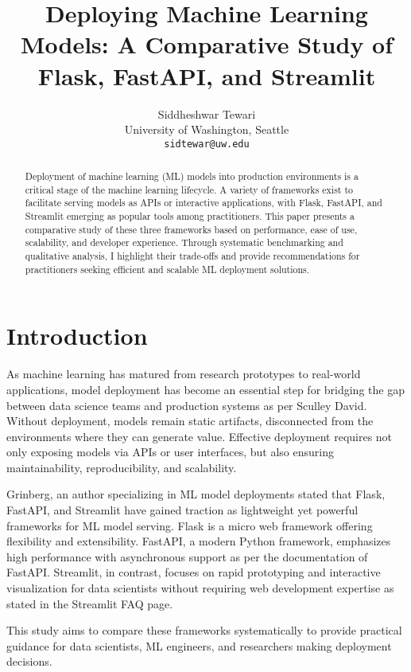 \documentclass[12pt]{article}
\title{Deploying Machine Learning Models: A Comparative Study of Flask, FastAPI, and Streamlit}
\author{Siddheshwar Tewari \\
University of Washington, Seattle \\
\texttt{sidtewar@uw.edu}}
\date{}
\begin{document}
\maketitle

\begin{abstract}
Deployment of machine learning (ML) models into production environments is a critical stage of the machine learning lifecycle. A variety of frameworks exist to facilitate serving models as APIs or interactive applications, with Flask, FastAPI, and Streamlit emerging as popular tools among practitioners. This paper presents a comparative study of these three frameworks based on performance, ease of use, scalability, and developer experience. Through systematic benchmarking and qualitative analysis, I highlight their trade-offs and provide recommendations for practitioners seeking efficient and scalable ML deployment solutions.
\end{abstract}


\section{Introduction}

As machine learning has matured from research prototypes to real-world applications, model deployment has become an essential step for bridging the gap between data science teams and production systems as per \cite{Sculley2015Hidden}Sculley David. Without deployment, models remain static artifacts, disconnected from the environments where they can generate value. Effective deployment requires not only exposing models via APIs or user interfaces, but also ensuring maintainability, reproducibility, and scalability.

\cite{Grinberg2018Flask}Grinberg, an author specializing in ML model deployments stated that Flask, FastAPI, and Streamlit have gained traction as lightweight yet powerful frameworks for ML model serving. Flask is a micro web framework offering flexibility and extensibility. FastAPI, a modern Python framework, emphasizes high performance with asynchronous support as per the documentation of \cite{FastAPI2023}FastAPI. Streamlit, in contrast, focuses on rapid prototyping and interactive visualization for data scientists without requiring web development expertise as stated in the \cite{Streamlit2022}Streamlit FAQ page.

This study aims to compare these frameworks systematically to provide practical guidance for data scientists, ML engineers, and researchers making deployment decisions.
\end{document}
